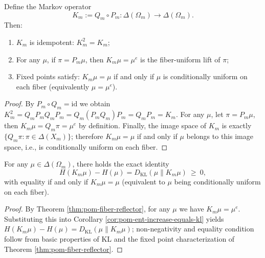 \begin{theorem}\label{thm:pom-fiber-reflector}
Define the Markov operator
\[
K_m:=Q_m\circ P_m:\Delta(\Omega_m)\to\Delta(\Omega_m).
\]
Then:
\begin{enumerate}
  \item $K_m$ is idempotent: $K_m^2=K_m$;
  \item For any $\mu$, if $\pi=P_m\mu$, then $K_m\mu=\mu^e$ is the fiber-uniform lift of $\pi$;
  \item Fixed points satisfy: $K_m\mu=\mu$ if and only if $\mu$ is conditionally uniform on each fiber (equivalently $\mu=\mu^e$).
\end{enumerate}
\end{theorem}
\begin{proof}
By $P_m\circ Q_m=\mathrm{id}$ we obtain
\(
K_m^2=Q_mP_mQ_mP_m=Q_m(P_mQ_m)P_m=Q_mP_m=K_m
\).
For any $\mu$, let $\pi=P_m\mu$, then $K_m\mu=Q_m\pi=\mu^e$ by definition.
Finally, the image space of $K_m$ is exactly $\{Q_m\pi:\pi\in\Delta(X_m)\}$; therefore $K_m\mu=\mu$ if and only if $\mu$ belongs to this image space, i.e., is conditionally uniform on each fiber.
\end{proof}

\begin{corollary}\label{cor:pom-second-law-Km}
For any $\mu\in\Delta(\Omega_m)$, there holds the exact identity
\[
\boxed{\;
H(K_m\mu)-H(\mu)=D_{\mathrm{KL}}(\mu\|K_m\mu)\ \ge\ 0,
\;}
\]
with equality if and only if $K_m\mu=\mu$ (equivalent to $\mu$ being conditionally uniform on each fiber).
\end{corollary}
\begin{proof}
By Theorem \ref{thm:pom-fiber-reflector}, for any $\mu$ we have $K_m\mu=\mu^e$.
Substituting this into Corollary \ref{cor:pom-ent-increase-equals-kl} yields
\(
H(K_m\mu)-H(\mu)=D_{\mathrm{KL}}(\mu\|K_m\mu)
\);
non-negativity and equality condition follow from basic properties of KL and the fixed point characterization of Theorem \ref{thm:pom-fiber-reflector}.
\end{proof}

